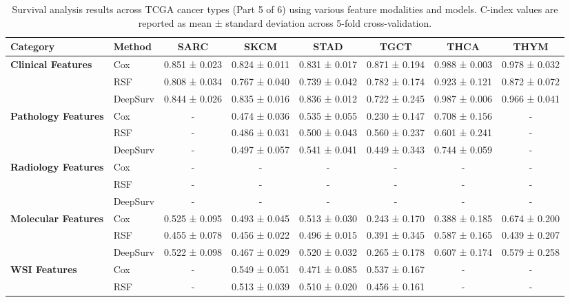 \begin{sidewaystable}[htbp]
    \centering
    \caption{Survival analysis results across TCGA cancer types (Part 5 of 6) using various feature modalities and models. C-index values are reported as mean ± standard deviation across 5-fold cross-validation.}
    \label{tab:survival_results_5}
    \begin{tabular}{@{}llcccccc@{}}
        \toprule
        \textbf{Category} & \textbf{Method} & \textbf{SARC} & \textbf{SKCM} & \textbf{STAD} & \textbf{TGCT} & \textbf{THCA} & \textbf{THYM} \\
        \midrule
        \multirow{3}{*}{\textbf{Clinical Features}} & Cox & 0.851 ± 0.023 & 0.824 ± 0.011 & 0.831 ± 0.017 & 0.871 ± 0.194 & 0.988 ± 0.003 & 0.978 ± 0.032 \\
        & RSF & 0.808 ± 0.034 & 0.767 ± 0.040 & 0.739 ± 0.042 & 0.782 ± 0.174 & 0.923 ± 0.121 & 0.872 ± 0.072 \\
        & DeepSurv & 0.844 ± 0.026 & 0.835 ± 0.016 & 0.836 ± 0.012 & 0.722 ± 0.245 & 0.987 ± 0.006 & 0.966 ± 0.041 \\
        \midrule
        \multirow{3}{*}{\textbf{Pathology Features}} & Cox & - & 0.474 ± 0.036 & 0.535 ± 0.055 & 0.230 ± 0.147 & 0.708 ± 0.156 & - \\
        & RSF & - & 0.486 ± 0.031 & 0.500 ± 0.043 & 0.560 ± 0.237 & 0.601 ± 0.241 & - \\
        & DeepSurv & - & 0.497 ± 0.057 & 0.541 ± 0.041 & 0.449 ± 0.343 & 0.744 ± 0.059 & - \\
        \midrule
        \multirow{3}{*}{\textbf{Radiology Features}} & Cox & - & - & - & - & - & - \\
        & RSF & - & - & - & - & - & - \\
        & DeepSurv & - & - & - & - & - & - \\
        \midrule
        \multirow{3}{*}{\textbf{Molecular Features}} & Cox & 0.525 ± 0.095 & 0.493 ± 0.045 & 0.513 ± 0.030 & 0.243 ± 0.170 & 0.388 ± 0.185 & 0.674 ± 0.200 \\
        & RSF & 0.455 ± 0.078 & 0.456 ± 0.022 & 0.496 ± 0.015 & 0.391 ± 0.345 & 0.587 ± 0.165 & 0.439 ± 0.207 \\
        & DeepSurv & 0.522 ± 0.098 & 0.467 ± 0.029 & 0.520 ± 0.032 & 0.265 ± 0.178 & 0.607 ± 0.174 & 0.579 ± 0.258 \\
        \midrule
        \multirow{3}{*}{\textbf{WSI Features}} & Cox & - & 0.549 ± 0.051 & 0.471 ± 0.085 & 0.537 ± 0.167 & - & - \\
        & RSF & - & 0.513 ± 0.039 & 0.510 ± 0.020 & 0.456 ± 0.161 & - & - \\

\end{tabular}
\end{sidewaystable}
